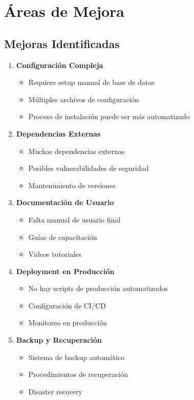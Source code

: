 \documentclass[12pt,a4paper]{article}
\begin{document}
\section{Áreas de Mejora}

\subsection{Mejoras Identificadas}

\begin{enumerate}
    \item \textbf{Configuración Compleja}
    \begin{itemize}
        \item Requiere setup manual de base de datos
        \item Múltiples archivos de configuración
        \item Proceso de instalación puede ser más automatizado
    \end{itemize}
    
    \item \textbf{Dependencias Externas}
    \begin{itemize}
        \item Muchas dependencias externas
        \item Posibles vulnerabilidades de seguridad
        \item Mantenimiento de versiones
    \end{itemize}
    
    \item \textbf{Documentación de Usuario}
    \begin{itemize}
        \item Falta manual de usuario final
        \item Guías de capacitación
        \item Videos tutoriales
    \end{itemize}
    
    \item \textbf{Deployment en Producción}
    \begin{itemize}
        \item No hay scripts de producción automatizados
        \item Configuración de CI/CD
        \item Monitoreo en producción
    \end{itemize}
    
    \item \textbf{Backup y Recuperación}
    \begin{itemize}
        \item Sistema de backup automático
        \item Procedimientos de recuperación
        \item Disaster recovery
    \end{itemize}
\end{enumerate}
\end{document}
